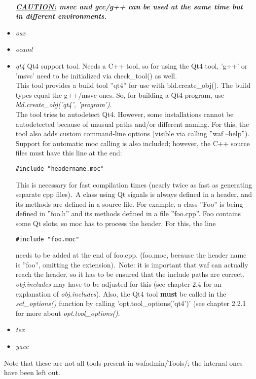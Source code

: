 \documentclass[a4paper,10pt]{article}
\begin{document}
\begin{itemize}
\\
		\emph{\textbf{\underline{CAUTION:} msvc and gcc/g++ can be used at the same time but in different environments.}}
	\item \emph{osx}
	\item \emph{ocaml}
	\item \emph{qt4}
		Qt4 support tool. Needs a C++ tool, so for using the Qt4 tool, 'g++' or 'msvc' need to be initialized via check\_tool() as well.\\
		This tool provides a build tool ''qt4'' for use with bld.create\_obj(). The build types equal the g++/msvc ones. So, for building a Qt4 program, use \emph{bld.create\_obj('qt4', 'program')}.
		\\
		The tool tries to autodetect Qt4. However, some installations cannot be autodetected because of unusual paths and/or different naming. For this, the tool also adds custom command-line options (visible via calling ''waf --help''). Support for automatic moc calling is also included; however, the C++ source files must have this line at the end: \begin{verbatim}#include "headername.moc"\end{verbatim} This is necessary for fast compilation times (nearly twice as fast as generating separate cpp files).\
		A class using Qt signals is always defined in a header, and its methods are defined in a source file. For example, a class ''Foo'' is being defined in ''foo.h'' and its methods defined in a file ''foo.cpp''. Foo contains some Qt slots, so moc has to process the header. For this, the line \begin{verbatim}#include "foo.moc"\end{verbatim} needs to be added at the end of foo.cpp. (foo.moc, because the header name is ''foo'', omitting the extension).\
		Note: it is important that waf can actually reach the header, so it has to be ensured that the include paths are correct. \emph{obj.includes} may have to be adjusted for this (see chapter 2.4 for an explanation of \emph{obj.includes}). Also, the Qt4 tool \textbf{must} be called in the \emph{set\_options()} function by calling 'opt.tool\_options('qt4')' (see chapter 2.2.1 for more about \emph{opt.tool\_options()}.
	\item \emph{tex}
	\item \emph{yacc}
\end{itemize}

Note that these are not all tools present in wafadmin/Tools/; the internal ones have been left out.
\end{document}
